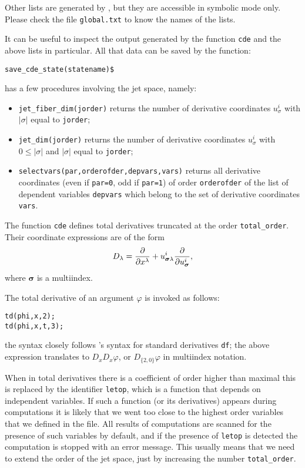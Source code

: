 Other lists are generated by \cde, but they are accessible in
\REDUCE symbolic mode only. Please check the file \texttt{global.txt} to know
the names of the lists.

It can be useful to inspect the output generated by the function \texttt{cde}
and the above lists in particular.  All that data can be saved by the function:
\begin{verbatim}
save_cde_state(statename)$
\end{verbatim}

\cde has a few procedures involving the jet space, namely:
\begin{itemize}
\item \texttt{jet\_fiber\_dim(jorder)} returns the number of derivative
  coordinates $u^i_\sigma$ with $|\sigma|$ equal to \texttt{jorder};
\item \texttt{jet\_dim(jorder)} returns the number of derivative
  coordinates $u^i_\sigma$ with $0\leq|\sigma|$ and $|\sigma|$ equal to
  \texttt{jorder};
\item \texttt{selectvars(par,orderofder,depvars,vars)} returns all derivative
  coordinates (even if \texttt{par=0}, odd if \texttt{par=1}) of order
  \texttt{orderofder} of the list of dependent variables \texttt{depvars} which
  belong to the set of derivative coordinates \texttt{vars}.
\end{itemize}

The function \texttt{cde} defines total derivatives truncated at the order
\texttt{total\_order}. Their coordinate
expressions are of the form
\begin{equation}
  \label{cdeeq:2}
  D_\lambda=\pd{}{x^\lambda} +
  u^i_{\boldsymbol{\sigma}\lambda}\pd{}{u^i_{\boldsymbol{\sigma}}},
\end{equation}
where $\boldsymbol{\sigma}$ is a multiindex.

The total derivative of an argument $\varphi$ is invoked as follows:
\begin{verbatim}
td(phi,x,2);
td(phi,x,t,3);
\end{verbatim}
the syntax closely follows \REDUCE's syntax for standard derivatives
\texttt{df}; the above expression translates to $D_xD_x\varphi$, or
$D_{\{2,0\}}\varphi$ in multiindex notation.

When in total derivatives there is a coefficient of order higher than maximal
this is replaced by the identifier \texttt{letop}, which is a function that
depends on independent variables. If such a function (or its derivatives)
appears during computations it is likely that we went too close to the highest
order variables that we defined in the file. All results of computations are
scanned for the presence of such variables by default, and if the presence of
\texttt{letop} is detected the computation is stopped with an error
message. This usually means that we need to extend the order of the jet space,
just by increasing the number \texttt{total\_order}.


